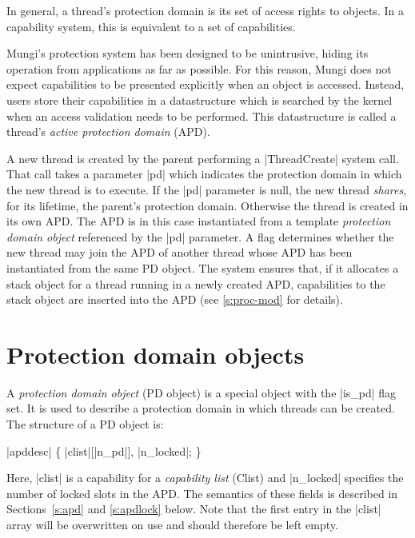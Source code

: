 \documentclass[a4paper,11pt,twoside,dvips]{report}
\begin{document}
In general, a thread's protection domain is its set of
access rights to objects. In a capability system, this is equivalent to
a set of capabilities.

Mungi's protection system has been designed to be unintrusive, hiding
its operation from applications as far as possible. For this reason,
Mungi does not expect capabilities to be presented explicitly when an
object is accessed. Instead, users store their capabilities in a
datastructure which is searched by the kernel when an access validation
needs to be performed. This datastructure is called a thread's
\emph{active protection domain} (APD).

A new thread is created by the parent performing a
|ThreadCreate| system call. That call takes a parameter |pd| which
indicates the protection domain in which the new thread is to
execute. If the |pd| parameter is null, the new thread \emph{shares},
for its lifetime, the parent's protection domain.  Otherwise the thread
is created in its own APD. The APD is in this case instantiated from a
template \emph{protection domain object} referenced by the |pd|
parameter. A flag determines whether the new thread may join the APD of
another thread whose APD has been instantiated from the same PD
object. The system ensures that, if it allocates a stack object for a
thread running in a newly created APD, capabilities to the stack object
are inserted into the APD (see \autoref{s:proc-mod} for
details).

\section{\label{s:pdo}Protection domain objects}



A \emph{protection domain object} (PD object) is a special object with
the |is\_pd| flag set. It is used to describe a protection domain in
which threads can be created. The structure of a PD object is:


\begin{center}
\begin{programbox}
\TYPE |apddesc| \BODY \{
	|clist|[|n\_pd|], |n\_locked|;
\ENDTYPE\}
\end{programbox}
\end{center}

Here, |clist| is a capability for a \emph{capability list} (Clist) and
|n\_locked| specifies the number of locked slots in the APD. The
semantics of these fields is described in Sections~\ref{s:apd} and
\ref{s:apdlock} below. Note that the first entry in the |clist| array
will be overwritten on use and should therefore be left empty.
\end{document}
